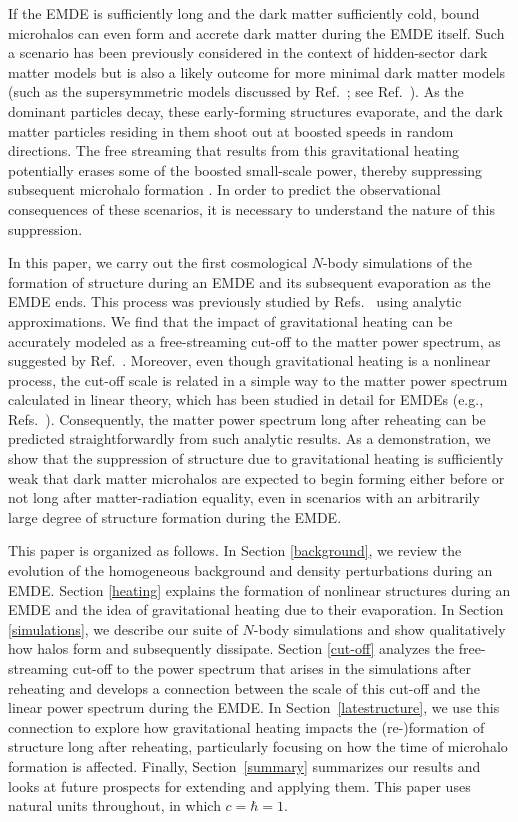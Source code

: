 \documentclass[a4paper,11pt]{article}
\begin{document}
If the EMDE is sufficiently long and the dark matter sufficiently cold, bound microhalos can even form and accrete dark matter during the EMDE itself. Such a scenario has been previously considered in the context of hidden-sector dark matter models \cite{blanco19} but is also a likely outcome for more minimal dark matter models (such as the supersymmetric models discussed by Ref.~\cite{aew16}; see Ref.~\cite{sten_gr}).
As the dominant particles decay, these early-forming structures evaporate, and the dark matter particles residing in them shoot out at boosted speeds in random directions.
The free streaming that results from this gravitational heating potentially erases some of the boosted small-scale power, thereby suppressing subsequent microhalo formation \cite{blanco19,barenboim_rem}. In order to predict the observational consequences of these scenarios, it is necessary to understand the nature of this suppression.

In this paper, we carry out the first cosmological $N$-body simulations of the formation of structure during an EMDE and its subsequent evaporation as the EMDE ends.
This process was previously studied by Refs.~\cite{blanco19,barenboim_rem} using analytic approximations.
We find that the impact of gravitational heating can be accurately modeled as a free-streaming cut-off to the matter power spectrum, as suggested by Ref.~\cite{blanco19}.
Moreover, even though gravitational heating is a nonlinear process, the cut-off scale is related in a simple way to the matter power spectrum calculated in linear theory, which has been studied in detail for EMDEs (e.g., Refs.~\cite{emde2,hg23}). Consequently, the matter power spectrum long after reheating can be predicted straightforwardly from such analytic results.
As a demonstration, we show that the suppression of structure due to gravitational heating is sufficiently weak that dark matter microhalos are expected to begin forming either before or not long after matter-radiation equality, even in scenarios with an arbitrarily large degree of structure formation during the EMDE. 


This paper is organized as follows. In Section \ref{background}, we review the evolution of the homogeneous background and density perturbations during an EMDE. Section \ref{heating} explains the formation of nonlinear structures during an EMDE and the idea of gravitational heating due to their evaporation. In Section \ref{simulations}, we describe our suite of $N$-body simulations and show qualitatively how halos form and subsequently dissipate. Section \ref{cut-off} analyzes the free-streaming cut-off to the power spectrum that arises in the simulations after reheating and develops a connection between the scale of this cut-off and the linear power spectrum during the EMDE. In Section~\ref{latestructure}, we use this connection to explore how gravitational heating impacts the (re-)formation of structure long after reheating, particularly focusing on how the time of microhalo formation is affected. Finally, Section~\ref{summary} summarizes our results and looks at future prospects for extending and applying them. This paper uses natural units throughout, in which $c = \hbar = 1$.
\end{document}
